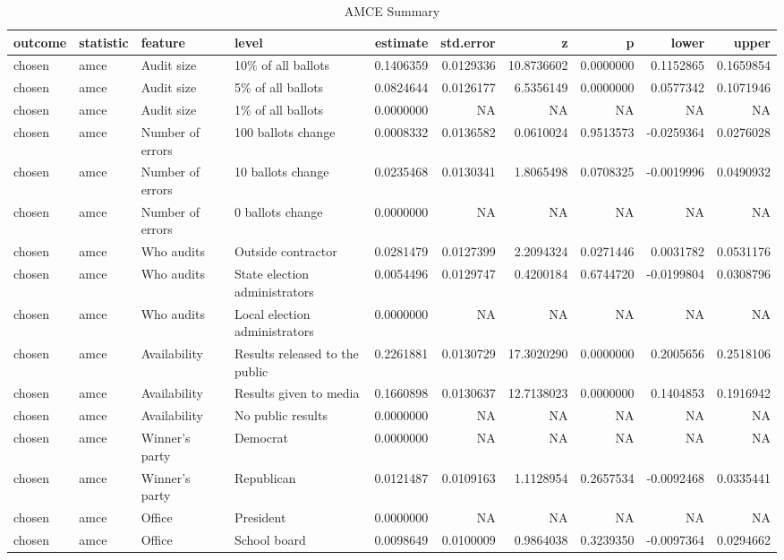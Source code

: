 \begin{table}

\caption{AMCE Summary}
\centering
\begin{tabular}[t]{llllrrrrrr}
\toprule
outcome & statistic & feature & level & estimate & std.error & z & p & lower & upper\\
\midrule
chosen & amce & Audit size & 10\% of all ballots & 0.1406359 & 0.0129336 & 10.8736602 & 0.0000000 & 0.1152865 & 0.1659854\\
chosen & amce & Audit size & 5\% of all ballots & 0.0824644 & 0.0126177 & 6.5356149 & 0.0000000 & 0.0577342 & 0.1071946\\
chosen & amce & Audit size & 1\% of all ballots & 0.0000000 & NA & NA & NA & NA & NA\\
chosen & amce & Number of errors & 100 ballots change & 0.0008332 & 0.0136582 & 0.0610024 & 0.9513573 & -0.0259364 & 0.0276028\\
chosen & amce & Number of errors & 10 ballots change & 0.0235468 & 0.0130341 & 1.8065498 & 0.0708325 & -0.0019996 & 0.0490932\\
\addlinespace
chosen & amce & Number of errors & 0 ballots change & 0.0000000 & NA & NA & NA & NA & NA\\
chosen & amce & Who audits & Outside contractor & 0.0281479 & 0.0127399 & 2.2094324 & 0.0271446 & 0.0031782 & 0.0531176\\
chosen & amce & Who audits & State election administrators & 0.0054496 & 0.0129747 & 0.4200184 & 0.6744720 & -0.0199804 & 0.0308796\\
chosen & amce & Who audits & Local election administrators & 0.0000000 & NA & NA & NA & NA & NA\\
chosen & amce & Availability & Results released to the public & 0.2261881 & 0.0130729 & 17.3020290 & 0.0000000 & 0.2005656 & 0.2518106\\
\addlinespace
chosen & amce & Availability & Results given to media & 0.1660898 & 0.0130637 & 12.7138023 & 0.0000000 & 0.1404853 & 0.1916942\\
chosen & amce & Availability & No public results & 0.0000000 & NA & NA & NA & NA & NA\\
chosen & amce & Winner's party & Democrat & 0.0000000 & NA & NA & NA & NA & NA\\
chosen & amce & Winner's party & Republican & 0.0121487 & 0.0109163 & 1.1128954 & 0.2657534 & -0.0092468 & 0.0335441\\
chosen & amce & Office & President & 0.0000000 & NA & NA & NA & NA & NA\\
\addlinespace
chosen & amce & Office & School board & 0.0098649 & 0.0100009 & 0.9864038 & 0.3239350 & -0.0097364 & 0.0294662\\
\bottomrule
\end{tabular}
\end{table}
